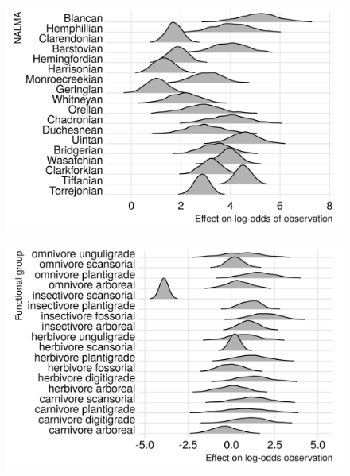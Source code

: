 \documentclass[12pt,letterpaper]{article}
\begin{document}
\begin{figure}[ht]
  \includegraphics[width=\textwidth,height=0.4\textheight,keepaspectratio=true]{figure/time_observation}
  \caption{}
  \label{fig:time_observe}
\end{figure}

\begin{figure}[ht]
  \includegraphics[width=\textwidth,height=0.4\textheight,keepaspectratio=true]{figure/ecotype_observation}
  \caption{}
  \label{fig:fg_observe}
\end{figure}
\end{document}
